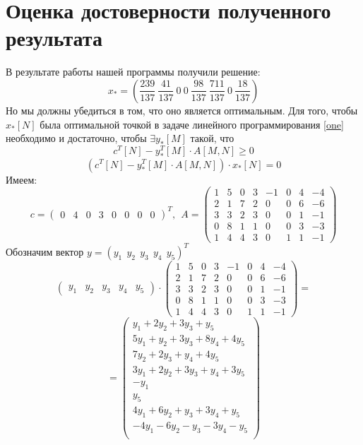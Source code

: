\documentclass{article}
\begin{document}
\section{Оценка достоверности полученного результата}
\label{mark}
\noindent В результате работы нашей программы получили решение:
$$x_{*} = (\frac{239}{137}~\frac{41}{137}~0~0~\frac{98}{137}~\frac{711}{137}~0~\frac{18}{137}) $$
Но мы должны убедиться в том, что оно является оптимальным.
Для того, чтобы $x_{*}[N]$ была оптимальной точкой в задаче линейного программирования \eqref{one} необходимо и достаточно, чтобы $\exists y_{*}[M]$ такой, что
\begin{equation*}
    c^T[N]-y_{*}^T[M] \cdot A[M,N] \ge 0
\end{equation*}
\begin{equation*}
    (c^T[N]-y_{*}^T[M] \cdot A[M,N]) \cdot x_{*}[N] = 0
\end{equation*}
Имеем:
\begin{equation*}
c =
\begin{pmatrix}
0 & 4 & 0 & 3 & 0 & 0 & 0 & 0
\end{pmatrix}^T,
~~
A = 
\begin{pmatrix}
1 & 5 & 0 & 3 & -1 & 0 & 4 & -4\\
2 & 1 & 7 & 2 & 0 & 0 & 6 & -6\\
3 & 3 & 2 & 3 & 0 & 0 & 1 & -1\\
0 & 8 & 1 & 1 & 0 & 0 & 3 & -3\\
1 & 4 & 4 &3 & 0 & 1 & 1 & -1
\end{pmatrix}
\end{equation*}
Обозначим вектор $y = (y_1~~y_2~~y_3~~y_4~~y_5)^T$
\begin{equation*}
 \begin{pmatrix}
 y_1 & y_2 & y_3 & y_4 & y_5
 \end{pmatrix}
 \cdot 
 \begin{pmatrix}
1 & 5 & 0 & 3 & -1 & 0 & 4 & -4\\
2 & 1 & 7 & 2 & 0 & 0 & 6 & -6\\
3 & 3 & 2 & 3 & 0 & 0 & 1 & -1\\
0 & 8 & 1 & 1 & 0 & 0 & 3 & -3\\
1 & 4 & 4 &3 & 0 & 1 & 1 & -1
\end{pmatrix}
=
\end{equation*}
\begin{equation*}
=
    \begin{pmatrix}
    y_1+2y_2+3y_3+y_5 \\ 5y_1+y_2+3y_3+8y_4+4y_5 \\ 7y_2+2y_3+y_4+4y_5 \\ 3y_1+2y_2+3y_3+y_4+3y_5 \\ -y_1 \\ y_5 \\ 4y_1+6y_2+y_3+3y_4+y_5 \\ -4y_1-6y_2-y_3-3y_4-y_5\\
    \end{pmatrix}
\end{equation*}
~
\end{document}

